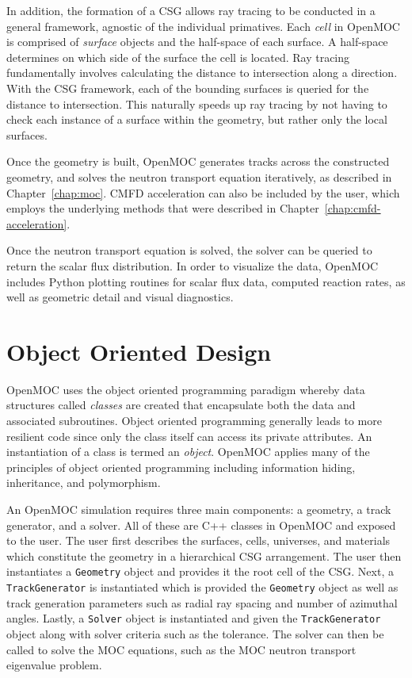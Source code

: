 In addition, the formation of a CSG allows ray tracing to be conducted in a general framework, agnostic of the individual primatives. Each \textit{cell} in OpenMOC is comprised of \textit{surface} objects and the half-space of each surface. A half-space determines on which side of the surface the cell is located. Ray tracing fundamentally involves calculating the distance to intersection along a direction. With the CSG framework, each of the bounding surfaces is queried for the distance to intersection. This naturally speeds up ray tracing by not having to check each instance of a surface within the geometry, but rather only the local surfaces. 

Once the geometry is built, OpenMOC generates tracks across the constructed geometry, and solves the neutron transport equation iteratively, as described in Chapter~\ref{chap:moc}. CMFD acceleration can also be included by the user, which employs the underlying methods that were described in Chapter~\ref{chap:cmfd-acceleration}.

Once the neutron transport equation is solved, the solver can be queried to return the scalar flux distribution. In order to visualize the data, OpenMOC includes Python plotting routines for scalar flux data, computed reaction rates, as well as geometric detail and visual diagnostics. 


\section{Object Oriented Design}
\label{sec:object-oriented}

OpenMOC uses the object oriented programming paradigm whereby data structures called \textit{classes} are created that encapsulate both the data and associated subroutines. Object oriented programming generally leads to more resilient code since only the class itself can access its private attributes. An instantiation of a class is termed an \textit{object}. OpenMOC applies many of the principles of object oriented programming including information hiding, inheritance, and polymorphism.

An OpenMOC simulation requires three main components: a geometry, a track generator, and a solver. All of these are C++ classes in OpenMOC and exposed to the user. The user first describes the surfaces, cells, universes, and materials which constitute the geometry in a hierarchical CSG arrangement. The user then instantiates a \texttt{Geometry} object and provides it the root cell of the CSG. Next, a \texttt{TrackGenerator} is instantiated which is provided the \texttt{Geometry} object as well as track generation parameters such as radial ray spacing and number of azimuthal angles. Lastly, a \texttt{Solver} object is instantiated and given the \texttt{TrackGenerator} object along with solver criteria such as the tolerance. The solver can then be called to solve the MOC equations, such as the MOC neutron transport eigenvalue problem.

